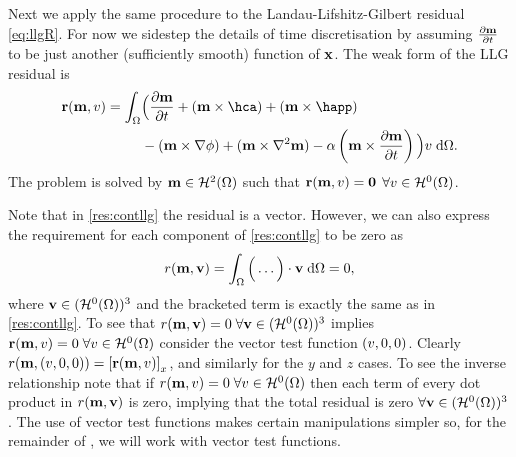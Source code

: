 {Next we apply the same procedure to the Landau-Lifshitz-Gilbert residual \cref{eq:llgR}.
For now we sidestep the details of time discretisation by assuming $\frac{\partial \boldsymbol{\mathrm{m}}}{\partial t}$ to be just another (sufficiently smooth) function of $\boldsymbol{\mathrm{x}}$.
The weak form of the LLG residual is
\begin{equation}
  \begin{aligned}
    \rllgv(\mv, \test) = \int_\magd &\Big( \dmdt
    + (\mv \times \hca) + (\mv \times \happ) \\
    &- (\mv \times \grad \phi) + (\mv \times \lap \mv) - \dampc \left( \mv
      \times \dmdt \right) \Big) \test \d\magd.
    \label{res:contllg}
  \end{aligned}
\end{equation}
The problem is solved by $\boldsymbol{\mathrm{m}} \in \mathcal{H}^2(\Omega)$ such that $\boldsymbol{\mathrm{r}}(\boldsymbol{\mathrm{m}}, v) = \mathbf{0}$ $\forall v \in \mathcal{H}^0(\Omega)$.

Note that in \cref{res:contllg} the residual is a vector.
However, we can also express the requirement for each component of \cref{res:contllg} to be zero as
\begin{equation}
  r(\boldsymbol{\mathrm{m}}, \boldsymbol{\mathrm{v}}) = \int_\Omega \Big( \ldots  \Big) \cdot \boldsymbol{\mathrm{v}} {\; \mathrm{{d}}}\Omega = 0,
\end{equation}
where $\boldsymbol{\mathrm{v}} \in (\mathcal{H}^0(\Omega))^3$ and the bracketed term is exactly the same as in \cref{res:contllg}.
To see that $r(\boldsymbol{\mathrm{m}}, \boldsymbol{\mathrm{v}}) = 0\; \forall \boldsymbol{\mathrm{v}} \in (\mathcal{H}^0(\Omega))^3$ implies $\boldsymbol{\mathrm{r}}(\boldsymbol{\mathrm{m}}, v) = 0 \; \forall v \in \mathcal{H}^0(\Omega)$ consider the vector test function $(v, 0, 0)$.
Clearly $r(\boldsymbol{\mathrm{m}}, (v, 0, 0)) = {\left[ \boldsymbol{\mathrm{r}}(\boldsymbol{\mathrm{m}}, v) \right]}_x$, and similarly for the $y$ and $z$ cases.
To see the inverse relationship note that if $r(\boldsymbol{\mathrm{m}}, v) = 0\; \forall v \in \mathcal{H}^0(\Omega)$ then each term of every dot product in $r(\boldsymbol{\mathrm{m}}, \boldsymbol{\mathrm{v}})$ is zero, implying that the total residual is zero $\forall \boldsymbol{\mathrm{v}} \in (\mathcal{H}^0(\Omega))^3$.
The use of vector test functions makes certain manipulations simpler so, for the remainder of , we will work with vector test functions.

}
